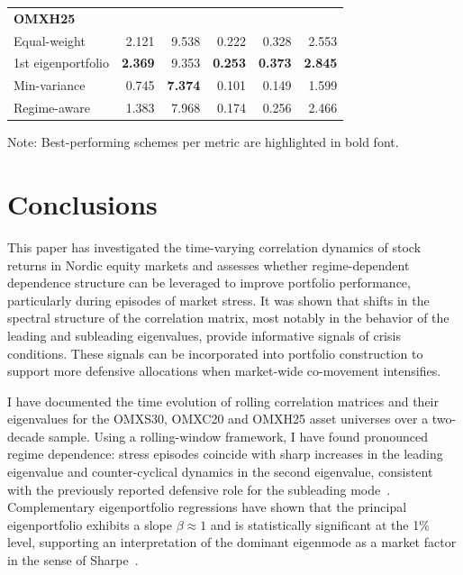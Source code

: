 \documentclass[pdflatex,sn-basic]{sn-jnl}%
\theoremstyle{thmstyleone}%
\theoremstyle{thmstyletwo}%
\theoremstyle{thmstylethree}%
\begin{document}
\begin{table}
\begin{tabular}{lrrrrr}
        \hline
    \textbf{OMXH25}     & &   & &     &     \\ 
Equal-weight           & 2.121        & 9.538        & 0.222        & 0.328        & 2.553        \\
1st eigenportfolio     & \textbf{2.369}        & 9.353        & \textbf{0.253}        & \textbf{0.373}        & \textbf{2.845}        \\
Min-variance           & 0.745        & \textbf{7.374}        & 0.101        & 0.149        & 1.599        \\
Regime-aware           & 1.383        & 7.968        & 0.174        & 0.256        & 2.466        \\
        \hline
    \end{tabular}
    Note: Best-performing schemes per metric are highlighted in bold font.
\end{table}

\section{Conclusions}
\label{sec:conclusions}
This paper has investigated the time-varying correlation dynamics of stock returns in Nordic equity markets and assesses whether regime-dependent dependence structure can be leveraged to improve portfolio performance, particularly during episodes of market stress. It was shown that shifts in the spectral structure of the correlation matrix, most notably in the behavior of the leading and subleading eigenvalues, provide informative signals of crisis conditions. These signals can be incorporated into portfolio construction to support more defensive allocations when market-wide co-movement intensifies.

I have documented the time evolution of rolling correlation matrices and their 
eigenvalues for the OMXS30, OMXC20 and OMXH25 asset universes over a two-decade sample. Using a 
rolling-window framework, I have found pronounced regime dependence: stress episodes coincide 
with sharp increases in the leading eigenvalue and counter-cyclical dynamics in the second 
eigenvalue, consistent with the previously reported defensive role for the 
subleading mode~\citep{molero2025random}. Complementary eigenportfolio 
regressions have shown that the principal eigenportfolio exhibits a slope $\beta\approx 1$ and is 
statistically significant at the 1\% level, supporting an interpretation of the dominant eigenmode 
as a market factor in the sense of Sharpe~\cite{sharpe1964capital}.
\end{document}
